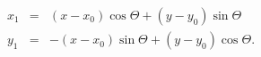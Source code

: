\begin{article}

\begin{eqnarray}
   x_{1} & = & (x - x_{0}) \cos \Theta + 
        (y - y_{0}) \sin \Theta \\ 
   y_{1} & = & -(x - x_{0}) \sin \Theta + 
        (y - y_{0}) \cos \Theta.
\end{eqnarray}


\setcounter{equation}{0}





\end{article}
